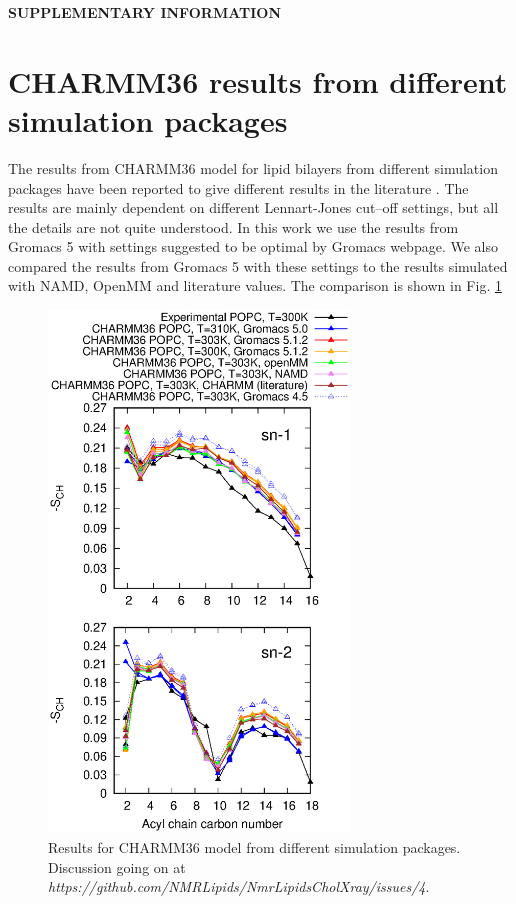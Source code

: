 \documentclass[aps,prl,superscriptaddress,twocolumn]{revtex4}
\begin{document}
\begin{acknowledgments}
\end{acknowledgments}
\newpage
\appendix
\begin{center}
{\bf SUPPLEMENTARY INFORMATION}
\end{center}
\section{CHARMM36 results from different simulation packages}
The results from CHARMM36 model for lipid bilayers from different 
simulation packages have been reported to give different results in
the literature \cite{piggot12,lee16}. The results are mainly
dependent on different Lennart-Jones cut--off settings, but
all the details are not quite understood. In this work we use
the results from Gromacs 5 with settings suggested to be optimal
by Gromacs webpage. We also compared the results from Gromacs 5 with
these settings to the results simulated with NAMD, OpenMM and literature
values. The comparison is shown in Fig. \ref{programsCOMP}
 \begin{figure}[]
  \centering
  \includegraphics[width=8cm]{../FIGS/OrderParametersPROGRAMS.eps}

  \caption{\label{programsCOMP}
    Results for CHARMM36 model \cite{klauda10} from different simulation packages.
    Discussion going on at {\it https://github.com/NMRLipids/NmrLipidsCholXray/issues/4}.
  }
\end{figure}




\listoftodos
\end{document}
